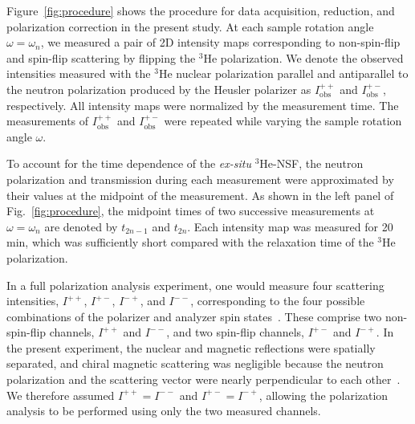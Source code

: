 \documentclass[%
 reprint,
superscriptaddress,
 amsmath,amssymb,
 aps,
floatfix,
]{revtex4-2}
\newcommand{\He}{$^3$He }
\newcommand{\Hensf}{$^3$He-NSF}
\begin{document}
Figure~\ref{fig:procedure} shows the procedure for data acquisition, reduction, and polarization correction in the present study.
At each sample rotation angle $\omega=\omega_n$, we measured a pair of 2D intensity maps corresponding to non-spin-flip and spin-flip scattering by flipping the \He polarization.
We denote the observed intensities measured with the \He nuclear polarization parallel and antiparallel to the neutron polarization produced by the Heusler polarizer as $I^{++}_\mathrm{obs}$ and $I^{+-}_\mathrm{obs}$, respectively.
All intensity maps were normalized by the measurement time.
The measurements of $I^{++}_\mathrm{obs}$ and $I^{+-}_\mathrm{obs}$ were repeated while varying the sample rotation angle $\omega$.

To account for the time dependence of the \textit{ex-situ} \Hensf, the neutron polarization and transmission during each measurement were approximated by their values at the midpoint of the measurement.
As shown in the left panel of Fig.~\ref{fig:procedure}, the midpoint times of two successive measurements at $\omega=\omega_n$ are denoted by $t_{2n-1}$ and $t_{2n}$.
Each intensity map was measured for 20 min, which was sufficiently short compared with the relaxation time of the \He polarization.

In a full polarization analysis experiment, one would measure four scattering intensities, $I^{++}$, $I^{+-}$, $I^{-+}$, and $I^{--}$, corresponding to the four possible combinations of the polarizer and analyzer spin states~\cite{babcock_discussion_2017}.
These comprise two non-spin-flip channels, $I^{++}$ and $I^{--}$, and two spin-flip channels, $I^{+-}$ and $I^{-+}$.
In the present experiment, the nuclear and magnetic reflections were spatially separated, and chiral magnetic scattering was negligible because the neutron polarization and the scattering vector were nearly perpendicular to each other~\cite{blume_polarization_1963}.
We therefore assumed $I^{++}=I^{--}$ and $I^{+-}=I^{-+}$, allowing the polarization analysis to be performed using only the two measured channels.
\end{document}

